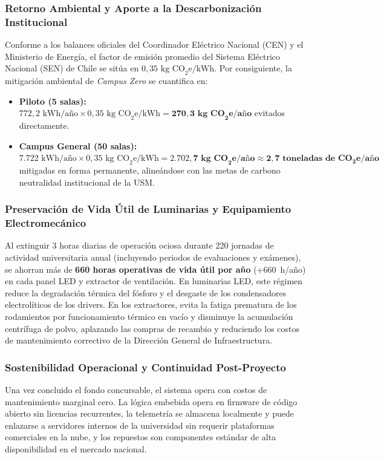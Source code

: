 \subsubsection{Retorno Ambiental y Aporte a la Descarbonización Institucional}
Conforme a los balances oficiales del Coordinador Eléctrico Nacional (CEN) y el Ministerio de Energía, el factor de emisión promedio del Sistema Eléctrico Nacional (SEN) de Chile se sitúa en \textbf{$0{,}35\text{ kg CO}_2\text{e/kWh}$}. Por consiguiente, la mitigación ambiental de \textit{Campus Zero} se cuantifica en:
\begin{itemize}
    \item \textbf{Piloto (5 salas):} $772{,}2\text{ kWh/año} \times 0{,}35\text{ kg CO}_2\text{e/kWh} = \mathbf{270{,}3\text{ kg CO}_2\text{e/año}}$ evitados directamente.
    \item \textbf{Campus General (50 salas):} $7.722\text{ kWh/año} \times 0{,}35\text{ kg CO}_2\text{e/kWh} = \mathbf{2.702{,}7\text{ kg CO}_2\text{e/año}} \approx \mathbf{2{,}7\text{ toneladas de CO}_2\text{e/año}}$ mitigadas en forma permanente, alineándose con las metas de carbono neutralidad institucional de la USM.
\end{itemize}

\subsubsection{Preservación de Vida Útil de Luminarias y Equipamiento Electromecánico}
Al extinguir 3 horas diarias de operación ociosa durante 220 jornadas de actividad universitaria anual (incluyendo periodos de evaluaciones y exámenes), se ahorran más de \textbf{660 horas operativas de vida útil por año} (+660~h/año) en cada panel LED y extractor de ventilación. En luminarias LED, este régimen reduce la degradación térmica del fósforo y el desgaste de los condensadores electrolíticos de los drivers. En los extractores, evita la fatiga prematura de los rodamientos por funcionamiento térmico en vacío y disminuye la acumulación centrífuga de polvo, aplazando las compras de recambio y reduciendo los costos de mantenimiento correctivo de la Dirección General de Infraestructura.

\subsubsection{Sostenibilidad Operacional y Continuidad Post-Proyecto}
Una vez concluido el fondo concursable, el sistema opera con costos de mantenimiento marginal cero. La lógica embebida opera en firmware de código abierto sin licencias recurrentes, la telemetría se almacena localmente y puede enlazarse a servidores internos de la universidad sin requerir plataformas comerciales en la nube, y los repuestos son componentes estándar de alta disponibilidad en el mercado nacional.

